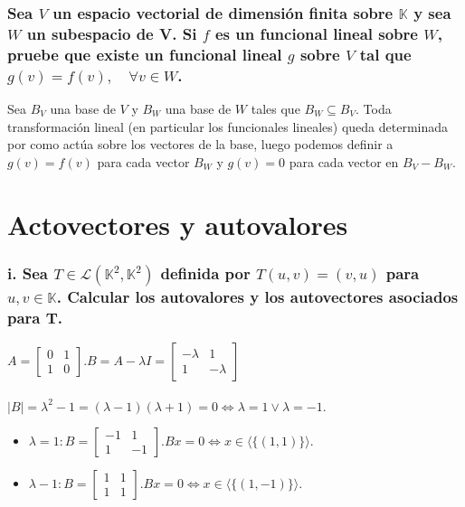 \documentclass{article}
\begin{document}
\subsubsection{Sea $V$ un espacio vectorial de dimensión finita sobre $\mathbb{K}$ y sea $W$ un subespacio de V. Si $f$
es un funcional lineal sobre $W$, pruebe que existe un funcional lineal $g$ sobre $V$ tal que $g(v)=f(v), \quad 
\forall v \in W$.}
Sea $B_V$ una base de $V$ y $B_W$ una base de $W$ tales que $B_W \subseteq B_V$. Toda transformación lineal 
(en particular los funcionales lineales) queda determinada por como actúa sobre los vectores de la base, luego podemos
definir a $g(v) = f(v)$ para cada vector $B_W$ y $g(v) = 0$ para cada vector en $B_V - B_W$.
\section{Actovectores y autovalores}
\subsubsection{i. Sea $T \in \mathcal{L}(\mathbb{K}^2,\mathbb{K}^2)$ definida por $T(u,v)=(v,u)$ para $u,v \in \mathbb{K}$.
Calcular los autovalores y los autovectores asociados para T.}
$A = \begin{bmatrix} 0&1 \\ 1&0\end{bmatrix}. B = A - \lambda I = \begin{bmatrix} -\lambda&1 \\ 1&-\lambda\end{bmatrix}$ \\ \\
$|B| = \lambda^2 - 1 = (\lambda - 1)(\lambda + 1) = 0 \Longleftrightarrow \lambda = 1 \vee \lambda = -1.$ \\
\begin{itemize}
\item
	$\lambda = 1: B = \begin{bmatrix} -1&1\\1&-1\end{bmatrix}. Bx = 0 \Longleftrightarrow x \in \langle \{ (1,1) \} \rangle$.
\item
	$\lambda -1: B = \begin{bmatrix} 1&1\\1&1 \end{bmatrix}. Bx = 0 \Longleftrightarrow x \in \langle \{ (1,-1) \}\rangle$.
\end{itemize}
\end{document}
